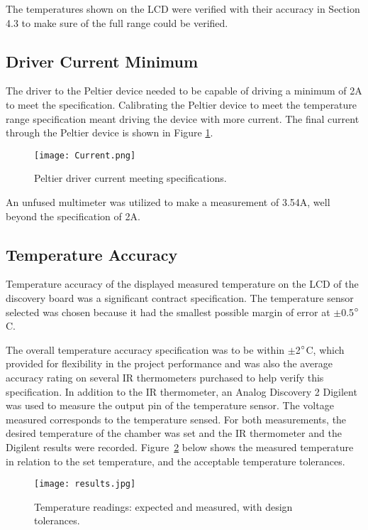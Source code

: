 \documentclass[11pt,letter]{article}
\begin{document}
The temperatures shown on the LCD were verified with their accuracy in Section 4.3 to make sure of the full range could be verified.

\subsection{Driver Current Minimum}

The driver to the Peltier device needed to be capable of driving a minimum of 2A to meet the specification. Calibrating the Peltier device to meet the temperature range specification meant driving the device with more current. The final current through the Peltier device is shown in Figure \ref{fig:current}.

\begin{figure}[H]
    \centering
    \texttt{[image: Current.png]}
    \caption{Peltier driver current meeting specifications.}
    \label{fig:current}
\end{figure}

An unfused multimeter was utilized to make a measurement of 3.54A, well beyond the specification of 2A.

\subsection{Temperature Accuracy}

Temperature accuracy of the displayed measured temperature on the LCD of the discovery board was a significant contract specification. The temperature sensor selected was chosen because it had the smallest possible margin of error at $\pm$0.5$\degree$C. 

The overall temperature accuracy specification was to be within $\pm$2$\degree$C, which provided for flexibility in the project performance and was also the average accuracy rating on several IR thermometers purchased to help verify this specification. In addition to the IR thermometer, an Analog Discovery 2 Digilent was used to measure the output pin of the temperature sensor. The voltage measured corresponds to the temperature sensed. For both measurements, the desired temperature of the chamber was set and the IR thermometer and the Digilent results were recorded. Figure~\ref{fig:comparison} below shows the measured temperature in relation to the set temperature, and the acceptable temperature tolerances.

\begin{figure}[H]
    \centering
    \texttt{[image: results.jpg]}
    \caption{Temperature readings: expected and measured, with design tolerances.}
    \label{fig:comparison}
\end{figure}
\end{document}
